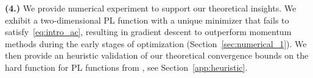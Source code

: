 \documentclass{article}
\newcommand{\jh}[1]{{\color{red} #1}}
\theoremstyle{plain}
\theoremstyle{definition}
\theoremstyle{remark}
\begin{document}
\noindent \textbf{(4.)} We provide numerical experiment to support our theoretical insights. We exhibit a two-dimensional PL function with a unique minimizer that fails to
satisfy~\eqref{eq:intro_ac}, resulting in gradient descent to outperform momentum methods during the early stages of optimization (Section~\ref{sec:numerical_1}). We then provide an heuristic validation of our theoretical convergence bounds on the hard function for PL functions from \cite{PLlowerbound}, see Section~\ref{app:heuristic}.








\end{document}
